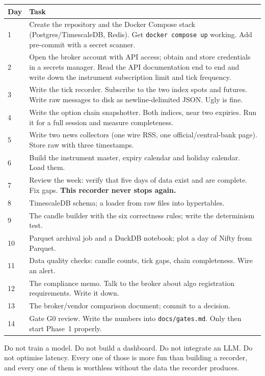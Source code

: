 \begin{longtable}{@{}p{1.6cm}p{13.0cm}@{}}
\toprule
\textbf{Day} & \textbf{Task}\\
\midrule
1 & Create the repository and the Docker Compose stack (Postgres/TimescaleDB,
Redis). Get \texttt{docker compose up} working. Add pre-commit with a secret
scanner.\\
2 & Open the broker account with API access; obtain and store credentials in a
secrets manager. Read the API documentation end to end and write down the
instrument subscription limit and tick frequency.\\
3 & Write the tick recorder. Subscribe to the two index spots and futures. Write
raw messages to disk as newline-delimited JSON. Ugly is fine.\\
4 & Write the option chain snapshotter. Both indices, near two expiries. Run it
for a full session and measure completeness.\\
5 & Write two news collectors (one wire RSS, one official/central-bank page).
Store raw with three timestamps.\\
6 & Build the instrument master, expiry calendar and holiday calendar. Load them.\\
7 & Review the week: verify that five days of data exist and are complete. Fix
gaps. \textbf{This recorder never stops again.}\\
8 & TimescaleDB schema; a loader from raw files into hypertables.\\
9 & The candle builder with the six correctness rules; write the determinism
test.\\
10 & Parquet archival job and a DuckDB notebook; plot a day of Nifty from
Parquet.\\
11 & Data quality checks: candle counts, tick gaps, chain completeness. Wire an
alert.\\
12 & The compliance memo. Talk to the broker about algo registration
requirements. Write it down.\\
13 & The broker/vendor comparison document; commit to a decision.\\
14 & Gate G0 review. Write the numbers into \texttt{docs/gates.md}. Only then
start Phase~1 properly.\\
\bottomrule
\end{longtable}

\begin{warnbox}[title={What not to do in the first fourteen days}]
Do not train a model. Do not build a dashboard. Do not integrate an LLM. Do not
optimise latency. Every one of those is more fun than building a recorder, and
every one of them is worthless without the data the recorder produces.
\end{warnbox}

